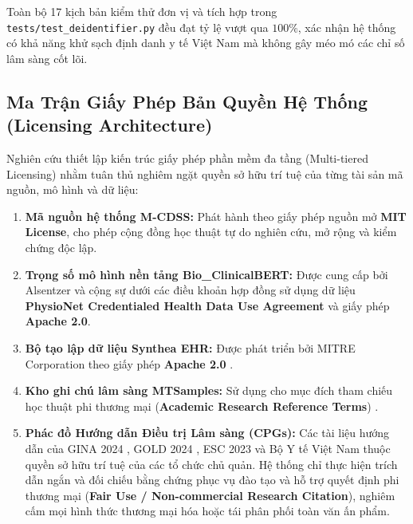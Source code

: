 Toàn bộ 17 kịch bản kiểm thử đơn vị và tích hợp trong \texttt{tests/test\_deidentifier.py} đều đạt tỷ lệ vượt qua $100\%$, xác nhận hệ thống có khả năng khử sạch định danh y tế Việt Nam mà không gây méo mó các chỉ số lâm sàng cốt lõi.

\subsection{Ma Trận Giấy Phép Bản Quyền Hệ Thống (Licensing Architecture)}
Nghiên cứu thiết lập kiến trúc giấy phép phần mềm đa tầng (Multi-tiered Licensing) nhằm tuân thủ nghiêm ngặt quyền sở hữu trí tuệ của từng tài sản mã nguồn, mô hình và dữ liệu:
\begin{enumerate}[leftmargin=1.8em, itemsep=0.2em]
    \item \textbf{Mã nguồn hệ thống M-CDSS:} Phát hành theo giấy phép nguồn mở \textbf{MIT License}, cho phép cộng đồng học thuật tự do nghiên cứu, mở rộng và kiểm chứng độc lập.
    \item \textbf{Trọng số mô hình nền tảng Bio\_ClinicalBERT:} Được cung cấp bởi Alsentzer và cộng sự \cite{alsentzer2019publicly} dưới các điều khoản hợp đồng sử dụng dữ liệu \textbf{PhysioNet Credentialed Health Data Use Agreement} và giấy phép \textbf{Apache 2.0}.
    \item \textbf{Bộ tạo lập dữ liệu Synthea EHR:} Được phát triển bởi MITRE Corporation theo giấy phép \textbf{Apache 2.0} \cite{walonoski2018synthea}.
    \item \textbf{Kho ghi chú lâm sàng MTSamples:} Sử dụng cho mục đích tham chiếu học thuật phi thương mại (\textbf{Academic Research Reference Terms}) \cite{mtsamples2012}.
    \item \textbf{Phác đồ Hướng dẫn Điều trị Lâm sàng (CPGs):} Các tài liệu hướng dẫn của GINA 2024 \cite{gina2024asthma}, GOLD 2024 \cite{gold2024copd}, ESC 2023 \cite{mcdonagh2023esc} và Bộ Y tế Việt Nam thuộc quyền sở hữu trí tuệ của các tổ chức chủ quản. Hệ thống chỉ thực hiện trích dẫn ngắn và đối chiếu bằng chứng phục vụ đào tạo và hỗ trợ quyết định phi thương mại (\textbf{Fair Use / Non-commercial Research Citation}), nghiêm cấm mọi hình thức thương mại hóa hoặc tái phân phối toàn văn ấn phẩm.
\end{enumerate}

